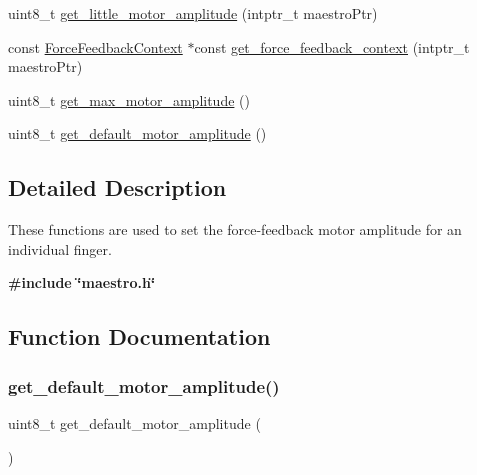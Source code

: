 \begin{DoxyCompactItemize}
\item 
uint8\+\_\+t \hyperlink{group__force_feedback_control_ga2c77aacc777827da2ac43e0e171d65f0}{get\+\_\+little\+\_\+motor\+\_\+amplitude} (intptr\+\_\+t maestro\+Ptr)
\item 
const \hyperlink{struct_force_feedback_context}{Force\+Feedback\+Context} $\ast$const \hyperlink{group__force_feedback_control_ga6017d2145085cfc8f6d455a29006a640}{get\+\_\+force\+\_\+feedback\+\_\+context} (intptr\+\_\+t maestro\+Ptr)
\item 
uint8\+\_\+t \hyperlink{group__force_feedback_control_ga9d7356bde899e98b4b79183595480857}{get\+\_\+max\+\_\+motor\+\_\+amplitude} ()
\item 
uint8\+\_\+t \hyperlink{group__force_feedback_control_ga53a3050b70abb081087d716415b0d679}{get\+\_\+default\+\_\+motor\+\_\+amplitude} ()
\end{DoxyCompactItemize}


\subsection{Detailed Description}
These functions are used to set the force-\/feedback motor amplitude for an individual finger. 

{\bfseries {\ttfamily \#include \char`\"{}maestro.\+h\char`\"{}}} 

\subsection{Function Documentation}
\mbox{\label{group__force_feedback_control_ga53a3050b70abb081087d716415b0d679}} 
\subsubsection{\texorpdfstring{get\+\_\+default\+\_\+motor\+\_\+amplitude()}{get\_default\_motor\_amplitude()}}
{\footnotesize\ttfamily uint8\+\_\+t get\+\_\+default\+\_\+motor\+\_\+amplitude (\begin{DoxyParamCaption}{ }\end{DoxyParamCaption})}

